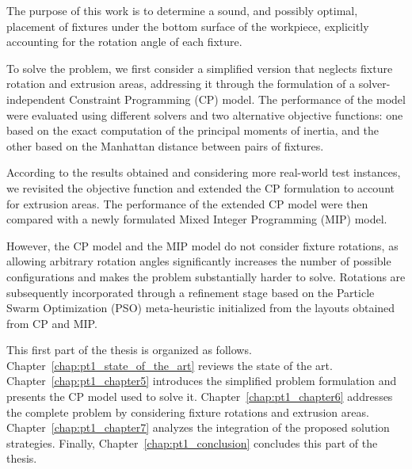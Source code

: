 The purpose of this work is to determine a sound, and possibly optimal, placement of fixtures under the bottom surface of the workpiece, explicitly accounting for the rotation angle of each fixture.

To solve the problem, we first consider a simplified version that neglects fixture rotation and extrusion areas, addressing it through the formulation of a solver-independent Constraint Programming (CP) model. The performance of the model were evaluated using different solvers and two alternative objective functions: one based on the exact computation of the principal moments of inertia, and the other based on the Manhattan distance between pairs of fixtures.

According to the results obtained and considering more real-world test instances, we revisited the objective function and extended the CP formulation to account for extrusion areas. The performance of the extended CP model were then compared with a newly formulated Mixed Integer Programming (MIP) model.

However, the CP model and the MIP model do not consider fixture rotations, as allowing arbitrary rotation angles significantly increases the number of possible configurations and makes the problem substantially harder to solve. Rotations are subsequently incorporated through a refinement stage based on the Particle Swarm Optimization (PSO) meta-heuristic initialized from the layouts obtained from CP and MIP.

This first part of the thesis is organized as follows. Chapter~\ref{chap:pt1_state_of_the_art} reviews the state of the art. Chapter~\ref{chap:pt1_chapter5} introduces the simplified problem formulation and presents the CP model used to solve it. Chapter~\ref{chap:pt1_chapter6} addresses the complete problem by considering fixture rotations and extrusion areas. Chapter~\ref{chap:pt1_chapter7} analyzes the integration of the proposed solution strategies. Finally, Chapter~\ref{chap:pt1_conclusion} concludes this part of the thesis.
